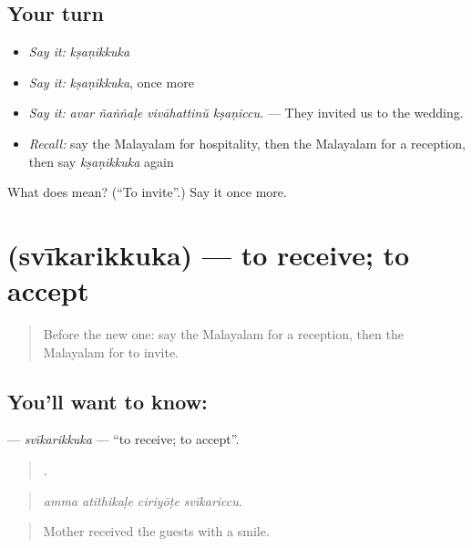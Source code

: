 \subsection*{Your turn}
\begin{itemize}
\raggedright
  \item \emph{Say it:} \emph{kṣaṇikkuka}
  \item \emph{Say it:} \emph{kṣaṇikkuka}, once more
  \item \emph{Say it:} \emph{avar ñaṅṅaḷe vivāhattinŭ kṣaṇiccu.} — They invited us to the wedding.
  \item \emph{Recall:} say the Malayalam for hospitality, then the Malayalam for a reception, then say \emph{kṣaṇikkuka} again
\end{itemize}

\begin{tcolorbox}[breakable,colback=teal!4,colframe=teal!35!black,title={Before you move on}]
What does  mean? (\textquotedblleft{}To invite\textquotedblright{}.) Say it once more.
\end{tcolorbox}
\section[\texorpdfstring{\ml{സ്വീകരിക്കുക} (svīkarikkuka)}{സ്വീകരിക്കുക (svīkarikkuka)}]{ (svīkarikkuka) — to receive; to accept}

\label{lesson:ML-C386-svikarikkuka}



\begin{quote}
Before the new one: say the Malayalam for a reception, then the Malayalam for to invite.
\end{quote}

\subsection*{You'll want to know: }
\textbf{} — \emph{svīkarikkuka} — \textquotedblleft{}to receive; to accept\textquotedblright{}.

\begin{quote}
   .
\end{quote}

\begin{quote}
\emph{amma atithikaḷe ciriyōṭe svīkariccu.}
\end{quote}

\begin{quote}
Mother received the guests with a smile.
\end{quote}

